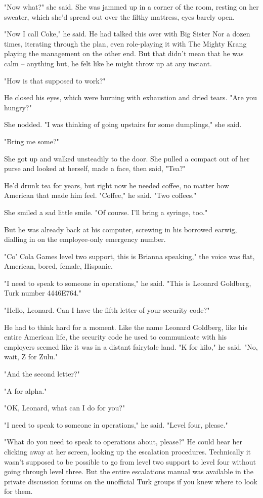 "Now what?" she said. She was jammed up in a corner of the room,
resting on her sweater, which she'd spread out over the filthy
mattress, eyes barely open.

"Now I call Coke," he said. He had talked this over with Big Sister
Nor a dozen times, iterating through the plan, even role-playing it
with The Mighty Krang playing the management on the other end. But
that didn't mean that he was calm -- anything but, he felt like he
might throw up at any instant.

"How is that supposed to work?"

He closed his eyes, which were burning with exhaustion and dried
tears. "Are you hungry?"

She nodded. "I was thinking of going upstairs for some dumplings,"
she said.

"Bring me some?"

She got up and walked unsteadily to the door. She pulled a compact
out of her purse and looked at herself, made a face, then said,
"Tea?"

He'd drunk tea for years, but right now he needed coffee, no matter
how American that made him feel. "Coffee," he said. "Two coffees."

She smiled a sad little smile. "Of course. I'll bring a syringe,
too."

But he was already back at his computer, screwing in his borrowed
earwig, dialling in on the employee-only emergency number.

"Co' Cola Games level two support, this is Brianna speaking," the
voice was flat, American, bored, female, Hispanic.

"I need to speak to someone in operations," he said. "This is
Leonard Goldberg, Turk number 4446E764."

"Hello, Leonard. Can I have the fifth letter of your security
code?"

He had to think hard for a moment. Like the name Leonard Goldberg,
like his entire American life, the security code he used to
communicate with his employers seemed like it was in a distant
fairytale land. "K for kilo," he said. "No, wait, Z for Zulu."

"And the second letter?"

"A for alpha."

"OK, Leonard, what can I do for you?"

"I need to speak to someone in operations," he said. "Level four,
please."

"What do you need to speak to operations about, please?" He could
hear her clicking away at her screen, looking up the escalation
procedures. Technically it wasn't supposed to be possible to go
from level two support to level four without going through level
three. But the entire escalations manual was available in the
private discussion forums on the unofficial Turk groups if you knew
where to look for them.

